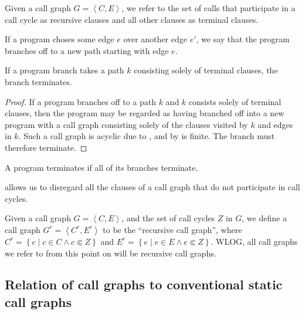 \begin{definition}\label{definition:recursive-terminal} Given a call graph $G =
\left\langle C,E \right\rangle$, we refer to the set of calls that participate
in a call cycle as recursive clauses and all other clauses as terminal
clauses.\end{definition}

\begin{definition} If a program choses some edge $e$ over another edge $e'$, we
say that the program branches off to a new path starting with edge
$e$.\end{definition}

\begin{theorem} If a program branch takes a path $k$ consisting solely of
terminal clauses, the branch terminates.\end{theorem}

\begin{proof} If a program branches off to a path $k$ and $k$ consists solely
of terminal clauses, then the program may be regarded as having branched off
into a new program with a call graph consisting solely of the clauses visited
by $k$ and edges in $k$. Such a call graph is acyclic due to
, and by
 is finite. The branch must therefore
terminate.\end{proof}

\begin{corollary}\label{corollary:program-branch-terminate} A program
terminates if all of its branches terminate.\end{corollary}

 allows us to disregard all the
clauses of a call graph that do not participate in call cycles.

\begin{definition}\label{definition:recursive-call-graph} Given a call graph
$G=\left\langle C, E \right\rangle$, and the set of call cycles $Z$ in $G$, we
define a call graph $G^r=\left\langle C^r, E^r\right\rangle$ to be the
``recursive call graph'', where $C^r=\left\{ c \mid c\in C \wedge c\Subset Z
\right\}$ and $E^r = \left\{ e \mid e\in E \wedge e\Subset Z \right\}$. WLOG,
all call graphs we refer to from this point on will be recursive call
graphs.\end{definition}

\subsection{Relation of call graphs to conventional static call graphs}

